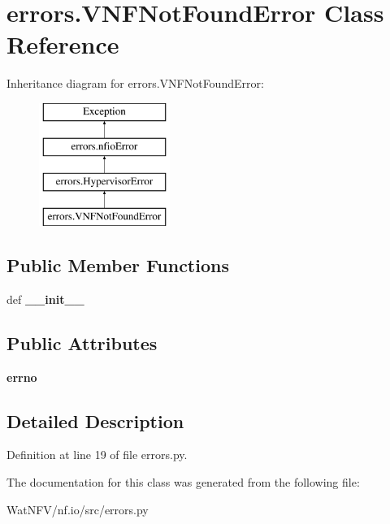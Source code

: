 \hypertarget{classerrors_1_1VNFNotFoundError}{\section{errors.\-V\-N\-F\-Not\-Found\-Error Class Reference}
\label{classerrors_1_1VNFNotFoundError}
}
Inheritance diagram for errors.\-V\-N\-F\-Not\-Found\-Error\-:\begin{figure}[H]
\begin{center}
\leavevmode
\includegraphics[height=4.000000cm]{classerrors_1_1VNFNotFoundError}
\end{center}
\end{figure}
\subsection*{Public Member Functions}
\begin{DoxyCompactItemize}
\item 
\hypertarget{classerrors_1_1VNFNotFoundError_a929f3afe0fed32e5a0d345fed81583ba}{def {\bfseries \-\_\-\-\_\-init\-\_\-\-\_\-}}\label{classerrors_1_1VNFNotFoundError_a929f3afe0fed32e5a0d345fed81583ba}

\end{DoxyCompactItemize}
\subsection*{Public Attributes}
\begin{DoxyCompactItemize}
\item 
\hypertarget{classerrors_1_1VNFNotFoundError_a972c73f0a6d8a4f4f4abbb54b4da9df5}{{\bfseries errno}}\label{classerrors_1_1VNFNotFoundError_a972c73f0a6d8a4f4f4abbb54b4da9df5}

\end{DoxyCompactItemize}


\subsection{Detailed Description}


Definition at line 19 of file errors.\-py.



The documentation for this class was generated from the following file\-:\begin{DoxyCompactItemize}
\item 
Wat\-N\-F\-V/nf.\-io/src/errors.\-py\end{DoxyCompactItemize}
